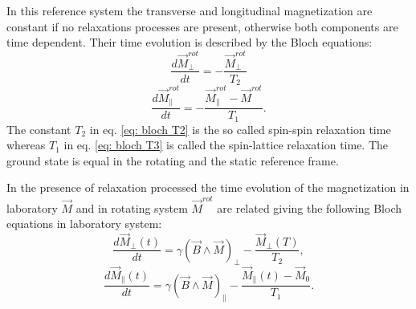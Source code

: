 In this reference system the transverse and longitudinal magnetization are constant if no relaxations processes are present, otherwise both components are time dependent. Their time evolution is described by the Bloch equations:
\begin{equation}
\label{eq: bloch T2}
\frac{d\vec{M}_\perp^{rot}}{dt} = -\frac{\vec{M}_\perp^{rot}}{T_2}
\end{equation}
\begin{equation}
\label{eq: bloch T3}
\frac{d\vec{M}_\parallel^{rot}}{dt} = -\frac{\vec{M}_\parallel^{rot} - \vec{M}^{rot}}{T_1}.
\end{equation}
The constant $T_2$ in eq. \ref{eq: bloch T2} is the so called spin-spin relaxation time whereas $T_1$ in eq. \ref{eq: bloch T3} is called the spin-lattice relaxation time. The ground state is equal in the rotating and the static reference frame. 

In the presence of relaxation processed the time evolution of the magnetization in laboratory $\vec{M}$ and in rotating system $\vec{M}^{rot}$ are related 
 giving the following Bloch equations in laboratory system:
 \begin{equation}
 \label{bloch + rot T2}
   \frac{d \vec{M}_{\perp}(t)}{dt} = \gamma(\vec{B}\wedge\vec{M})_\perp - \frac{\vec{M}_\perp (T)}{T_2},
  \end{equation} 
  \begin{equation}
  \label{bloch + rot T1}
     \frac{d \vec{M}_{\parallel}(t)}{dt} = \gamma(\vec{B}\wedge\vec{M})_\parallel  -\frac{\vec{M}_\parallel (t)-\vec{M}_0}{T_1}.
  \end{equation}
